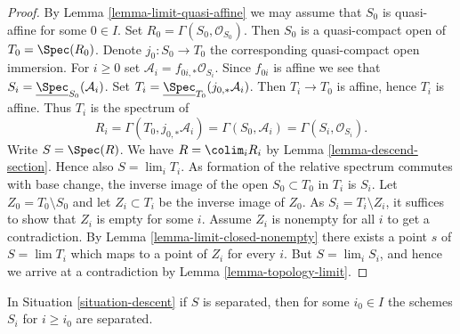\begin{proof}
By Lemma \ref{lemma-limit-quasi-affine} we may assume that $S_0$ is
quasi-affine for some $0 \in I$. Set $R_0 = \Gamma(S_0, \mathcal{O}_{S_0})$.
Then $S_0$ is a quasi-compact open of $T_0 = \Spec(R_0)$. Denote
$j_0 : S_0 \to T_0$ the corresponding quasi-compact open immersion.
For $i \geq 0$ set $\mathcal{A}_i = f_{0i, *}\mathcal{O}_{S_i}$.
Since $f_{0i}$ is affine we see that
$S_i = \underline{\Spec}_{S_0}(\mathcal{A}_i)$.
Set $T_i = \underline{\Spec}_{T_0}(j_{0, *}\mathcal{A}_i)$.
Then $T_i \to T_0$ is affine, hence $T_i$ is affine. Thus
$T_i$ is the spectrum of
$$
R_i = \Gamma(T_0, j_{0, *}\mathcal{A}_i) = \Gamma(S_0, \mathcal{A}_i) =
\Gamma(S_i, \mathcal{O}_{S_i}).
$$
Write $S = \Spec(R)$. We have $R = \colim_i R_i$
by Lemma \ref{lemma-descend-section}.
Hence also $S = \lim_i T_i$. As formation of the relative spectrum commutes
with base change, the inverse image
of the open $S_0 \subset T_0$ in $T_i$ is $S_i$.
Let $Z_0 = T_0 \setminus S_0$ and let $Z_i \subset T_i$
be the inverse image of $Z_0$. As $S_i = T_i \setminus Z_i$, it suffices
to show that $Z_i$ is empty for some $i$. Assume $Z_i$ is nonempty for all
$i$ to get a contradiction. By Lemma \ref{lemma-limit-closed-nonempty}
there exists a point $s$ of $S = \lim T_i$ which maps to a point of $Z_i$
for every $i$. But $S = \lim_i S_i$, and hence we arrive at a contradiction
by Lemma \ref{lemma-topology-limit}.
\end{proof}

\begin{lemma}
\label{lemma-limit-separated}
In Situation \ref{situation-descent} if $S$ is separated,
then for some $i_0 \in I$ the schemes $S_i$ for $i \geq i_0$
are separated.
\end{lemma}

